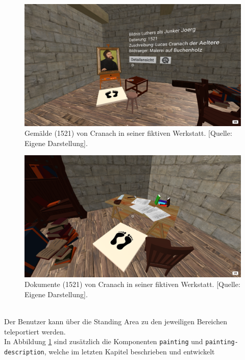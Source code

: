 \documentclass[a4paper,12pt,oneside]{article}
\begin{document}
        \begin{figure}
          \centering
          \includegraphics[scale=0.3]{img/coding/werkstatt2.png}
          \caption[Gemälde (1521) von Cranach in seiner fiktiven Werkstatt.]{Gemälde (1521) von Cranach in seiner fiktiven Werkstatt. [Quelle: Eigene Darstellung].}
          \label{fig:werkstatt2}
        \end{figure}
        \begin{figure}
          \centering
          \includegraphics[scale=0.3]{img/coding/werkstatt1.png}
          \caption[Dokumente (1521) von Cranach in seiner fiktiven Werkstatt.]{Dokumente (1521) von Cranach in seiner fiktiven Werkstatt. [Quelle: Eigene Darstellung].}
          \label{fig:werkstatt1}
        \end{figure} \\
        Der Benutzer kann über die Standing Area zu den jeweiligen Bereichen
        teleportiert werden. \\
        In Abbildung \ref{fig:werkstatt2} sind
        zusätzlich die
        Komponenten \texttt{painting} und \texttt{painting-description},
        welche im letzten Kapitel beschrieben und entwickelt 
\end{document}
